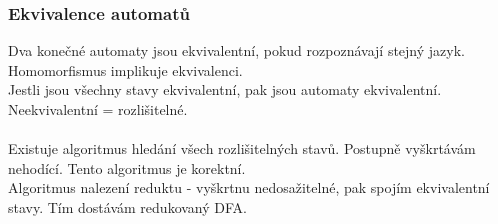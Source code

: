 \documentclass{article}
\begin{document}
\subsubsection*{Ekvivalence automatů}
Dva konečné automaty jsou ekvivalentní, pokud rozpoznávají stejný jazyk. Homomorfismus implikuje ekvivalenci.\\
Jestli jsou všechny stavy ekvivalentní, pak jsou automaty ekvivalentní. Neekvivalentní = rozlišitelné.\\\\

Existuje algoritmus hledání všech rozlišitelných stavů. Postupně vyškrtávám nehodící. Tento algoritmus je korektní.\\
Algoritmus nalezení reduktu - vyškrtnu nedosažitelné, pak spojím ekvivalentní stavy. Tím dostávám redukovaný DFA.\\
\end{document}
